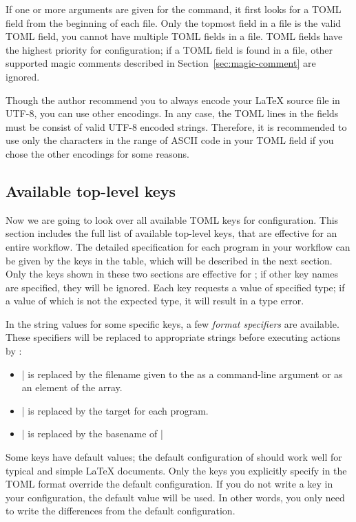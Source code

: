 \documentclass[draft]{llmk-doc}
\begin{document}
If one or more arguments are given for the  command, it first looks
for a TOML field from the beginning of each file. Only the topmost field in a
file is the valid TOML field, \ie you cannot have multiple TOML fields in a
file. TOML fields have the highest priority for  configuration; if a
TOML field is found in a file, other supported magic comments described in
Section~\ref{sec:magic-comment} are ignored.

Though the author recommend you to always encode your {\LaTeX} source file in
UTF-8, you can use other encodings. In any case, the TOML lines in the fields
must be consist of valid UTF-8 encoded strings. Therefore, it is recommended to
use only the characters in the range of ASCII code in your TOML field if you
chose the other encodings for some reasons.

\subsection{Available top-level keys}
\label{sec:top-level-keys}

Now we are going to look over all available TOML keys for 
configuration. This section includes the full list of available top-level keys,
that are effective for an entire workflow. The detailed specification for each
program in your workflow can be given by the keys in the  table,
which will be described in the next section. Only the keys shown in these two
sections are effective for ; if other key names are specified, they
will be ignored. Each key requests a value of specified type; if a value of
which is not the expected type, it will result in a type error.

In the string values for some specific keys, a few \emph{format specifiers} are
available. These specifiers will be replaced to appropriate strings before
executing actions by :
%
\begin{itemize}
\item |%
  is replaced by the filename given to the  as a command-line
  argument or as an element of the  array.
\item |%
  is replaced by the target for each program.
\item |%
  is replaced by the basename of |%
\end{itemize}

Some keys have default values; the default configuration of  should
work well for typical and simple {\LaTeX} documents. Only the keys you
explicitly specify in the TOML format override the default configuration. If
you do not write a key in your configuration, the default value will be used.
In other words, you only need to write the differences from the default
configuration.
\end{document}
